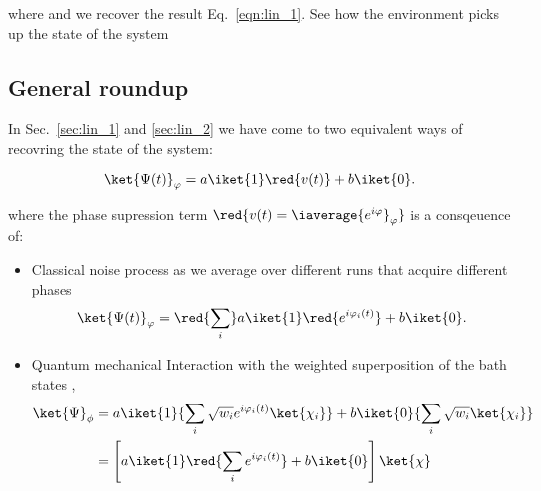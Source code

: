   \noindent where  and we recover the result Eq.~\eqref{eqn:lin_1}. See how the environment picks up the state of the system
  
 \subsection{General roundup}
  In Sec.~\ref{sec:lin_1} and \ref{sec:lin_2} we have come to two equivalent ways of recovring the state of the system:
  
  \begin{equation}\label{key}
  	\ket{\Psi(t)}_\varphi = a\iket{1}\red{v(t)} + b\iket{0}.
  \end{equation}
  
  \noindent where the phase supression term $ \red{v(t) = \iaverage{e^{i\varphi}}_\varphi} $ is a consqeuence of:
  
  \begin{itemize}
  	\item Classical noise process as we average over different runs that acquire different phases
  	 \begin{equation}\label{key}
  	 \ket{\Psi(t)}_\varphi = \red{\sum_i} a\iket{1}\red{e^{i\varphi_i(t)}} + b\iket{0}.
  	 \end{equation}
  	\item Quantum mechanical Interaction with the weighted superposition of the bath states , 
  	\begin{equation}\label{key}
  	 \begin{aligned}
	  	 \ket{\Psi}_\phi & = 	a\iket{1}{\sum_i\sqrt{w_i}e^{i\varphi_i(t)}\ket{\chi_i}} + b\iket{0}{\sum_i\sqrt{w_i}\ket{\chi_i}}\\
	  	 & = \left[a\iket{1}\red{\sum_ie^{i\varphi_i(t)}} + b\iket{0}\right]\ket{\chi}
  	 \end{aligned}
  	\end{equation}
  \end{itemize}
  
